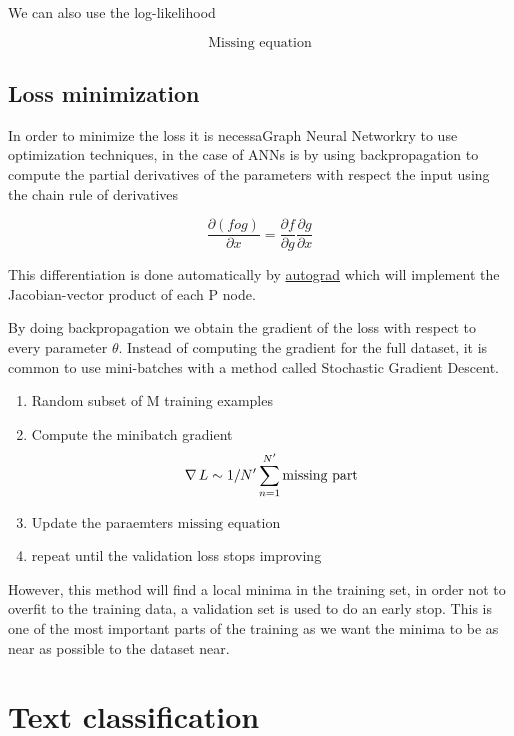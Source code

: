 \documentclass[b5paper]{report}
\begin{document}
We can also use the log-likelihood

\begin{equation}
  \text{Missing equation}
\end{equation}

\subsection{Loss minimization}

In order to minimize the loss it is necessaGraph Neural Networkry to use optimization techniques,
in the case of \glspl{ANN} is by using backpropagation to
compute the partial derivatives of the parameters with respect the input using
the chain rule of derivatives

\begin{equation}
  \frac{\partial(f o g)}{\partial x} = \frac{\partial f}{\partial
  g}\frac{\partial g}{\partial x}
\end{equation}

This differentiation is done automatically by
\href{https://github.com/HIPS/autograd}{autograd} which will implement the
Jacobian-vector product of each P node.

By doing backpropagation we obtain the gradient of the loss with respect to
every parameter $\theta$. Instead of computing the gradient for the full
dataset, it is common to use mini-batches with a method called Stochastic
Gradient Descent.

\begin{enumerate}
  \item Random subset of M training examples
  \item Compute the minibatch gradient
    \begin{equation}
      \operatorname*{\nabla} L \sim 1/N' \sum_{n=1}^{N'} \text{missing part}
    \end{equation}
  \item Update the paraemters $\text{missing equation}$
  \item repeat until the validation loss stops improving
\end{enumerate}

However, this method will find a local minima in the training set, in order not
to overfit to the training data, a validation set is used to do an early stop.
This is one of the most important parts of the training as we want the minima
to be as near as possible to the dataset near.

\section{Text classification}
\end{document}
